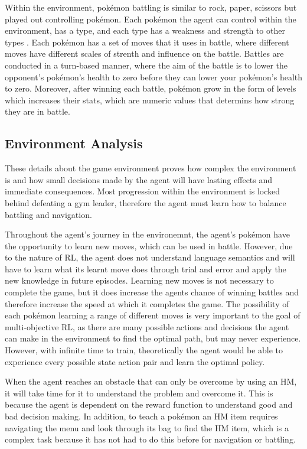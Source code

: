 Within the environment, pokémon battling is similar to rock, paper, scissors but played out controlling pokémon. Each pokémon the agent can control within the environment, has a type, and each type has a weakness and strength to other types \cite{SerebiiTeam2016}. Each pokémon has a set of moves that it uses in battle, where different moves have different scales of strenth and influence on the battle. Battles are conducted in a turn-based manner, where the aim of the battle is to lower the opponent's pokémon's health to zero before they can lower your pokémon's health to zero. Moreover, after winning each battle, pokémon grow in the form of levels which increases their stats, which are numeric values that determins how strong they are in battle. 


\subsection{Environment Analysis}

These details about the game environment proves how complex the environment is and how small decisions made by the agent will have lasting effects and immediate consequences. Most progression within the environment is locked behind defeating a gym leader, therefore the agent must learn how to balance battling and navigation. 

Throughout the agent's journey in the environemnt, the agent's pokémon have the opportunity to learn new moves, which can be used in battle. However, due to the nature of RL, the agent does not understand language semantics and will have to learn what its learnt move does through trial and error and apply the new knowledge in future episodes. Learning new moves is not necessary to complete the game, but it does increase the agents chance of winning battles and therefore increase the speed at which it completes the game. The possibility of each pokémon learning a range of different moves is very important to the goal of multi-objective RL, as there are many possible actions and decisions the agent can make in the environment to find the optimal path, but may never experience. However, with infinite time to train, theoretically the agent would be able to experience every possible state action pair and learn the optimal policy. 

When the agent reaches an obstacle that can only be overcome by using an HM, it will take time for it to understand the problem and overcome it. This is because the agent is dependent on the reward function to understand good and bad decision making. In addition, to teach a pokémon an HM item requires navigating the menu and look through its bag to find the HM item, which is a complex task because it has not had to do this before for navigation or battling.

